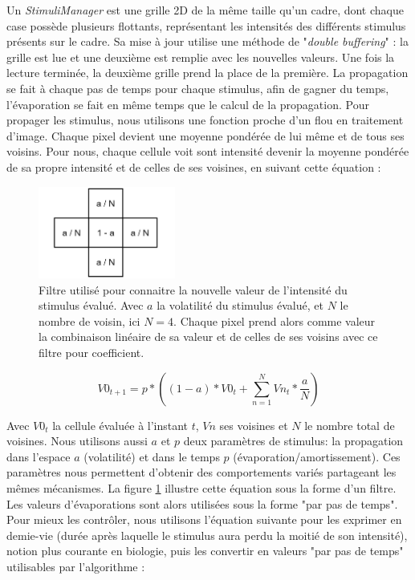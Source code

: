 			Un \textit{StimuliManager} est une grille 2D de la même taille qu'un cadre, dont chaque case possède plusieurs flottants, représentant les intensités des différents stimulus présents sur le cadre. Sa mise à jour utilise une méthode de "\textit{double buffering}" : la grille est lue et une deuxième est remplie avec les nouvelles valeurs. Une fois la lecture terminée, la deuxième grille prend la place de la première. La propagation se fait à chaque pas de temps pour chaque stimulus, afin de gagner du temps, l'évaporation se fait en même temps que le calcul de la propagation. Pour propager les stimulus, nous utilisons une fonction proche d'un flou en traitement d'image. Chaque pixel devient une moyenne pondérée de lui même et de tous ses voisins. Pour nous, chaque cellule voit sont intensité devenir la moyenne pondérée de sa propre intensité et de celles de ses voisines, en suivant cette équation :
			
			\begin{figure}
			\centering
			\includegraphics[width=0.4\textwidth]{./Pictures/Figures/flou.JPG}
			\caption{Filtre utilisé pour connaitre la nouvelle valeur de l'intensité du stimulus évalué. Avec $a$ la volatilité du stimulus évalué, et $N$ le nombre de voisin, ici $N=4$. Chaque pixel prend alors comme valeur la combinaison linéaire de sa valeur et de celles de ses voisins avec ce filtre pour coefficient.}
			\label{flou}
			\end{figure}
			
			\begin{equation}
			V0_{t+1} = p * ((1-a) * V0_t + \sum_{n=1}^{N} Vn_t * \frac{a}{N})
			\end{equation}
			
			Avec $V0_t$ la cellule évaluée à l'instant $t$, $Vn$ ses voisines et $N$ le nombre total de voisines. Nous utilisons aussi $a$ et $p$ deux paramètres de stimulus: la propagation dans l'espace $a$ (volatilité) et dans le temps $p$ (évaporation/amortissement). Ces paramètres nous permettent d'obtenir des comportements variés partageant les mêmes mécanismes. La figure \ref{flou} illustre cette équation sous la forme d'un filtre. Les valeurs d'évaporations sont alors utilisées sous la forme "par pas de temps". Pour mieux les contrôler, nous utilisons l'équation suivante pour les exprimer en demie-vie (durée après laquelle le stimulus aura perdu la moitié de son intensité), notion plus courante en biologie, puis les convertir en valeurs "par pas de temps" utilisables par l'algorithme :
			
